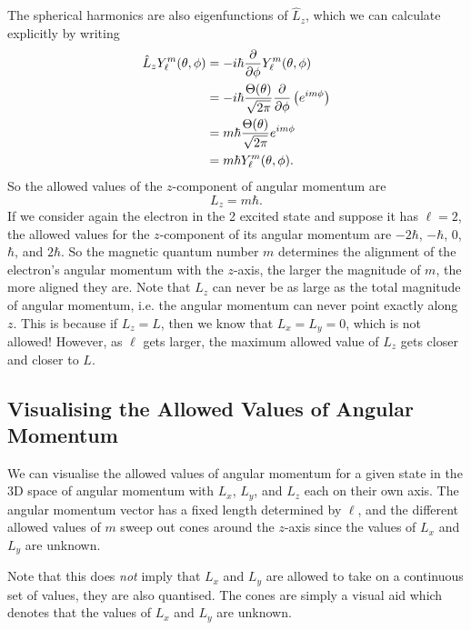 \documentclass[../quantum_mechanics.tex]{subfiles}
\begin{document}
            The spherical harmonics are also eigenfunctions of $\hat{L}_z$, which we can calculate explicitly by writing
            \begin{align}
                \hat{L}_zY_\ell^m(\theta,\phi)&=-i\hbar\pdv{}{\phi}Y_\ell^m(\theta,\phi)\\
                &=-i\hbar\frac{\Theta(\theta)}{\sqrt{2\pi}}\pdv{}{\phi}\left(e^{im\phi}\right)\\
                &=m\hbar\frac{\Theta(\theta)}{\sqrt{2\pi}}e^{im\phi}\\
                &=m\hbar Y_\ell^m(\theta,\phi).
            \end{align}
            So the allowed values of the $z$-component of angular momentum are
            \begin{equation}
                L_z=m\hbar.
            \end{equation}
            If we consider again the electron in the {2} excited state and suppose it has $\ell=2$, the allowed values for the $z$-component of its angular momentum are $-2\hbar$, $-\hbar$, $0$, $\hbar$, and $2\hbar$.
            So the magnetic quantum number $m$ determines the alignment of the electron's angular momentum with the $z$-axis, the larger the magnitude of $m$, the more aligned they are.
            Note that $L_z$ can never be as large as the total magnitude of angular momentum, i.e. the angular momentum can never point exactly along $z$.
            This is because if $L_z=L$, then we know that $L_x=L_y=0$, which is not allowed!
            However, as $\ell$ gets larger, the maximum allowed value of $L_z$ gets closer and closer to $L$.

        \subsection{Visualising the Allowed Values of Angular Momentum}\label{sec:angular-momentum:subsec:visualising-the-allowed-values}
            We can visualise the allowed values of angular momentum for a given state in the 3D space of angular momentum with $L_x$, $L_y$, and $L_z$ each on their own axis.
            The angular momentum vector has a fixed length determined by $\ell$, and the different allowed values of $m$ sweep out cones around the $z$-axis since the values of $L_x$ and $L_y$ are unknown.

            Note that this does \textit{not} imply that $L_x$ and $L_y$ are allowed to take on a continuous set of values, they are also quantised.
            The cones are simply a visual aid which denotes that the values of $L_x$ and $L_y$ are unknown.
\end{document}
